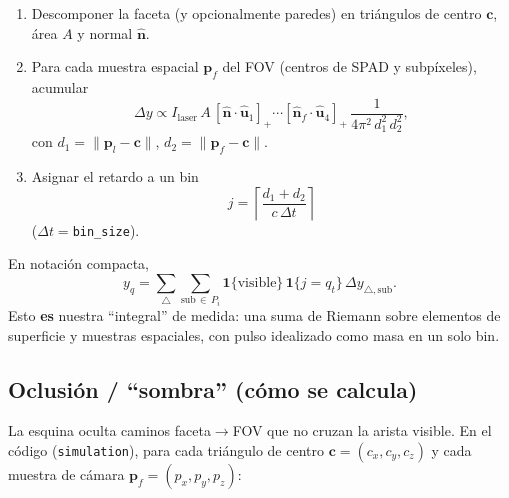 \documentclass[11pt,a4paper]{article}
\theoremstyle{definition}
\newcommand{\vect}[1]{\boldsymbol{#1}}
\begin{document}
\begin{enumerate}[leftmargin=1.4cm]
    \item Descomponer la faceta (y opcionalmente paredes) en tri\'angulos de
          centro $\vect{c}$, \'area $A$ y normal $\hat{\vect{n}}$.
    \item Para cada muestra espacial $\vect{p}_f$ del FOV (centros de SPAD
          y subp\'ixeles), acumular
    \begin{equation}
        \Delta y
        \propto
        I_{\mathrm{laser}}\,
        A\,
        [\hat{\vect{n}}\cdot\hat{\vect{u}}_1]_+
        \cdots
        [\hat{\vect{n}}_f\cdot\hat{\vect{u}}_4]_+
        \,\frac{1}{4\pi^{2}\,d_1^{2}\,d_2^{2}},
        \label{eq:dy}
    \end{equation}
          con $d_1=\|\vect{p}_l-\vect{c}\|$, $d_2=\|\vect{p}_f-\vect{c}\|$.
    \item Asignar el retardo a un bin
    \begin{equation}
        j
        =
        \left\lceil
            \frac{d_1+d_2}{c\,\Delta t}
        \right\rceil
        \label{eq:bin}
    \end{equation}
          ($\Delta t=$\texttt{bin\_size}).
\end{enumerate}

En notaci\'on compacta,
\begin{equation}
    y_q
    =
    \sum_{\triangle}
    \sum_{\mathrm{sub}\,\in\,P_i}
    \mathbf{1}\{\mathrm{visible}\}
    \,\mathbf{1}\{j=q_t\}
    \,\Delta y_{\triangle,\mathrm{sub}}.
    \label{eq:y-sum}
\end{equation}
Esto \textbf{es} nuestra ``integral'' de medida: una suma de Riemann sobre
elementos de superficie y muestras espaciales, con pulso idealizado como masa
en un solo bin.

\subsection{Oclusi\'on / ``sombra'' (c\'omo se calcula)}
\label{sec:sombra}
La esquina oculta caminos faceta$\to$FOV que no cruzan la arista visible.
En el c\'odigo (\texttt{simulation}), para cada tri\'angulo de centro
$\vect{c}=(c_x,c_y,c_z)$ y cada muestra de c\'amara $\vect{p}_f=(p_x,p_y,p_z)$:
\end{document}
